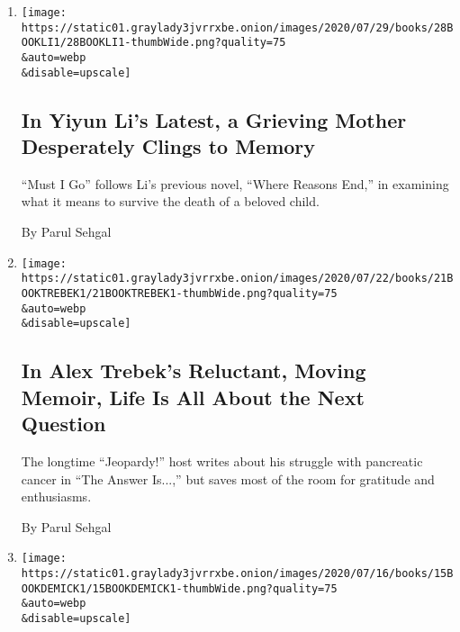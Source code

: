 \begin{enumerate}
\def\labelenumi{\arabic{enumi}.}
\item
  \href{/2020/07/28/books/review-must-i-go-yiyun-li.html}{}

  \texttt{[image: https://static01.graylady3jvrrxbe.onion/images/2020/07/29/books/28BOOKLI1/28BOOKLI1-thumbWide.png?quality=75\\\&auto=webp\\\&disable=upscale]}

  \hypertarget{in-yiyun-lis-latest-a-grieving-mother-desperately-clings-to-memory}{%
  \subsection{In Yiyun Li's Latest, a Grieving Mother Desperately Clings
  to
  Memory}\label{in-yiyun-lis-latest-a-grieving-mother-desperately-clings-to-memory}}

  ``Must I Go'' follows Li's previous novel, ``Where Reasons End,'' in
  examining what it means to survive the death of a beloved child.

  By Parul Sehgal
\item
  \href{/2020/07/21/books/review-answer-is-alex-trebek-jeopardy-memoir.html}{}

  \texttt{[image: https://static01.graylady3jvrrxbe.onion/images/2020/07/22/books/21BOOKTREBEK1/21BOOKTREBEK1-thumbWide.png?quality=75\\\&auto=webp\\\&disable=upscale]}

  \hypertarget{in-alex-trebeks-reluctant-moving-memoir-life-is-all-about-the-next-question}{%
  \subsection{In Alex Trebek's Reluctant, Moving Memoir, Life Is All
  About the Next
  Question}\label{in-alex-trebeks-reluctant-moving-memoir-life-is-all-about-the-next-question}}

  The longtime ``Jeopardy!'' host writes about his struggle with
  pancreatic cancer in ``The Answer Is...,'' but saves most of the room
  for gratitude and enthusiasms.

  By Parul Sehgal
\item
  \href{/2020/07/15/books/eat-buddha-life-death-tibetan-town-barbara-demick.html}{}

  \texttt{[image: https://static01.graylady3jvrrxbe.onion/images/2020/07/16/books/15BOOKDEMICK1/15BOOKDEMICK1-thumbWide.png?quality=75\\\&auto=webp\\\&disable=upscale]}

  \hypertarget{eat-the-buddha-reports-from-the-world-capital-of-self-immolations}{%
}
\end{enumerate}
